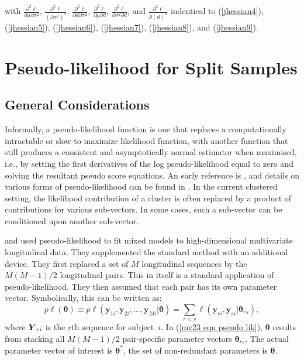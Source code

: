 \documentclass[11pt,a5paper,twoside]{book}
\newcommand{\BY}{\mbox{\boldmath $Y$}}
\begin{document}
{with $\frac{\partial^2\ell}{\partial \mu \partial \sigma^2}$, $\frac{\partial^2\ell}{(\partial \sigma^2)^2}$, $\frac{\partial^2\ell}{\partial d \partial \sigma^2}$, $\frac{\partial^2\ell}{\partial \mu \partial d}$, $\frac{\partial^2\ell}{\partial \sigma^2 \partial d}$, and $\frac{\partial^2\ell}{\partial (d)^2}$ indentical to (\ref{jhessian4}),
(\ref{jhessian5}), (\ref{jhessian6}), (\ref{jhessian7}), (\ref{jhessian8}), and (\ref{jhessian9}).

\setcounter{equation}{0}
\section{Pseudo-likelihood for Split Samples}
\label{splitsample}

\subsection{General Considerations}
Informally, a pseudo-likelihood function is one that replaces a computationally intractable or slow-to-maximize likelihood function, with another function that still produces a consistent and asymptotically normal estimator when maximised, i.e., by setting the first derivatives of the log pseudo-likelihood equal to zero and solving the resultant pseudo score equations. An early reference is \cite{arnold1991}, and details on various forms of pseudo-likelihood can be found in \cite[Ch.~9, 12, 21, 22, 24, and 25]{molenberghs2005}. In the current clustered setting, the likelihood contribution of a cluster is often replaced by a product of contributions for various sub-vectors. In some cases, such a sub-vector can be conditioned upon another sub-vector.

\cite{Verbeke2006} and \cite{Fetal06} used pseudo-likelihood to fit mixed models to high-dimensional multivariate longitudinal data. They supplemented the standard method with an additional device. They first replaced a set of $M$ longitudinal sequences by the $M(M-1)/2$ longitudinal pairs. This in itself is a standard application of pseudo-likelihood. They then assumed that each pair has its own parameter vector.
Symbolically, this can be written as:
\begin{equation}
p\ell({\bm{\theta}})  \equiv  p\ell(\mathbf{y}_{1i}, \mathbf{y}_{2i}, \ldots, \mathbf{y}_{Mi} |{\bm{\theta}})
 =  \sum_{r<s} \ell(\mathbf{y}_{ri}, \mathbf{y}_{si} | \bm{\theta}_{rs}), \label{mv23 eqn pseudo lik}
\end{equation}
where $\BY_{ri}$ is the $r$th sequence for subject~$i$. In (\ref{mv23 eqn pseudo lik}), $\bm{\theta}$ results from stacking all $M(M-1)/2$ pair-specific parameter vectors $\bm{\theta}_{rs}$. The actual parameter vector of interest is  $\bm{\theta}^*$, the set of non-redundant parameters is $\bm{\theta}$.

}
\end{document}
